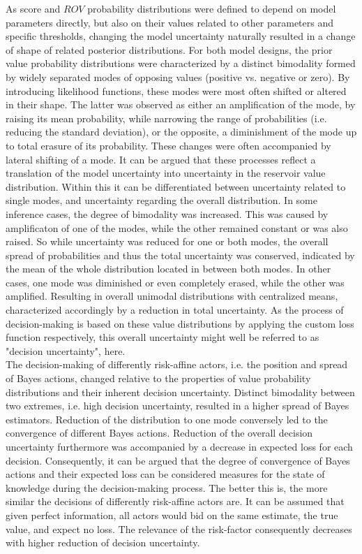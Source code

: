 	As score and $ROV$ probability distributions were defined to depend on model parameters directly, but also on their values related to other parameters and specific thresholds, changing the model uncertainty naturally resulted in a change of shape of related posterior distributions. For both model designs, the prior value probability distributions were characterized by a distinct bimodality formed by widely separated modes of opposing values (positive vs. negative or zero). By introducing likelihood functions, these modes were most often shifted or altered in their shape. The latter was observed as either an amplification of the mode, by raising its mean probability, while narrowing the range of probabilities (i.e. reducing the standard deviation), or the opposite, a diminishment of the mode up to total erasure of its probability. These changes were often accompanied by lateral shifting of a mode. It can be argued that these processes reflect a translation of the model uncertainty into uncertainty in the reservoir value distribution. Within this it can be differentiated between uncertainty related to single modes, and uncertainty regarding the overall distribution. In some inference cases, the degree of bimodality was increased. This was caused by amplificaton of one of the modes, while the other remained constant or was also raised. So while uncertainty was reduced for one or both modes, the overall spread of probabilities and thus the total uncertainty was conserved, indicated by the mean of the whole distribution located in between both modes. In other cases, one mode was diminished or even completely erased, while the other was amplified. Resulting in overall unimodal distributions with centralized means, characterized accordingly by a reduction in total uncertainty. As the process of decision-making is based on these value distributions by applying the custom loss function respectively, this overall uncertainty might well be referred to as "decision uncertainty", here.\\
	The decision-making of differently risk-affine actors, i.e. the position and spread of Bayes actions, changed relative to the properties of value probability distributions and their inherent decision uncertainty. Distinct bimodality between two extremes, i.e. high decision uncertainty, resulted in a higher spread of Bayes estimators. Reduction of the distribution to one mode conversely led to the convergence of different Bayes actions. Reduction of the overall decision uncertainty furthermore was accompanied by a decrease in expected loss for each decision. Consequently, it can be argued that the degree of convergence of Bayes actions and their expected loss can be considered measures for the state of knowledge during the decision-making process. The better this is, the more similar the decisions of differently risk-affine actors are. It can be assumed that given perfect information, all actors would bid on the same estimate, the true value, and expect no loss. The relevance of the risk-factor consequently decreases with higher reduction of decision uncertainty.\\
